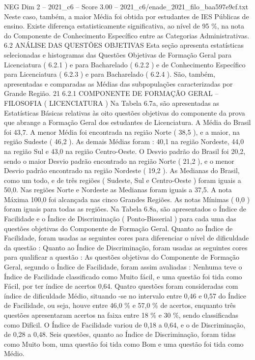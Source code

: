 \begin{textsample}{NEG Dim 2 – 2021\_c6 – Score 3.00 – 2021\_c6/enade\_2021\_filo\_baa597e9cf.txt}
Neste caso, também, a maior Média foi obtida por estudantes de IES Públicas de ensino.
Existe diferença estatisticamente significativa, ao nível de 95 \%, na nota do Componente de Conhecimento Específico entre as Categorias Administrativas. 6.2 ANÁLISE DAS QUESTÕES OBJETIVAS Esta seção apresenta estatísticas selecionadas e histogramas das Questões Objetivas de Formação Geral para Licenciatura ( 6.2.1 ) e para Bacharelado ( 6.2.2 ) e de Conhecimento Específico para Licenciatura ( 6.2.3 ) e para Bacharelado ( 6.2.4 ).
São, também, apresentadas e comparadas as Médias das subpopulações caracterizadas por Grande Região. 21 6.2.1 COMPONENTE DE FORMAÇÃO GERAL – FILOSOFIA ( LICENCIATURA ) Na Tabela 6.7a, são apresentadas as Estatísticas Básicas relativas às oito questões objetivas do componente da prova que abrange a Formação Geral dos estudantes de Licenciatura.
A Média do Brasil foi 43,7.
A menor Média foi encontrada na região Norte ( 38,5 ), e a maior, na região Sudeste ( 46,2 ).
As demais Médias foram : 40,1 na região Nordeste, 44,0 na região Sul e 43,0 na região Centro-Oeste.
O Desvio padrão do Brasil foi 20,2, sendo o maior Desvio padrão encontrado na região Norte ( 21,2 ), e o menor Desvio padrão encontrado na região Nordeste ( 19,2 ).
As Medianas do Brasil, como um todo, e de três regiões ( Sudeste, Sul e Centro-Oeste ) foram iguais a 50,0.
Nas regiões Norte e Nordeste as Medianas foram iguais a 37,5.
A nota Máxima 100,0 foi alcançada nas cinco Grandes Regiões.
As notas Mínimas ( 0,0 ) foram iguais para todas as regiões.
Na Tabela 6.8a, são apresentados o Índice de Facilidade e o Índice de Discriminação ( Ponto-Bisserial ) para cada uma das questões objetivas do Componente de Formação Geral.
Quanto ao Índice de Facilidade, foram usadas as seguintes cores para diferenciar o nível de dificuldade da questão : Quanto ao Índice de Discriminação, foram usadas as seguintes cores para qualificar a questão : As questões objetivas do Componente de Formação Geral, segundo o Índice de Facilidade, foram assim avaliadas : Nenhuma teve o Índice de Facilidade classificado como Muito fácil, e uma questão foi tida como Fácil, por ter índice de acertos 0,64.
Quatro questões foram consideradas com índice de dificuldade Médio, situando -se no intervalo entre 0,46 e 0,57 do Índice de Facilidade, ou seja, houve entre 46,0 \% e 57,0 \% de acertos, enquanto três questões apresentaram acertos na faixa entre 18 \% e 30 \%, sendo classificadas como Difícil.
O Índice de Facilidade variou de 0,18 a 0,64, e o de Discriminação, de 0,28 a 0,48.
Seis questões, quanto ao Índice de Discriminação, foram tidas como Muito bom, uma questão foi tida como Bom e uma questão foi tida como Médio.

\end{textsample}
